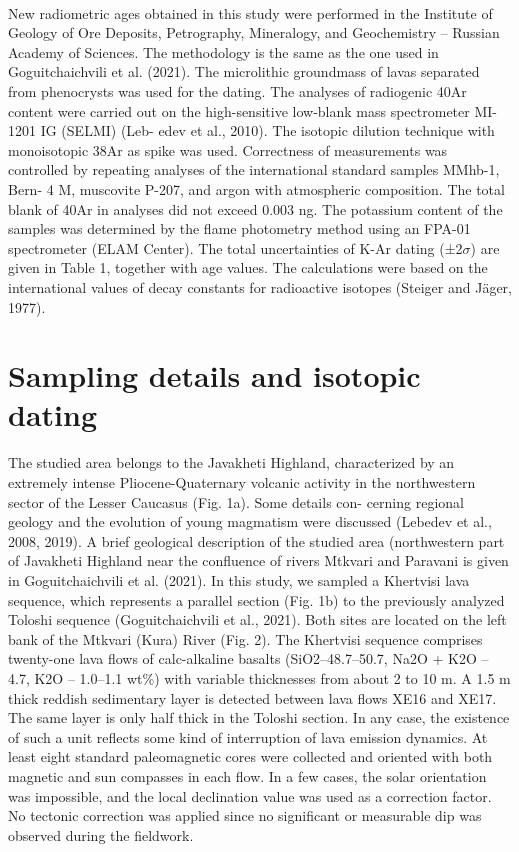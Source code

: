 \documentclass[review]{elsarticle}
\begin{document}
\\
New radiometric ages obtained in this study were performed in the
Institute of Geology of Ore Deposits, Petrography, Mineralogy, and
Geochemistry – Russian Academy of Sciences. The methodology is the
same as the one used in Goguitchaichvili et al. (2021). The microlithic
groundmass of lavas separated from phenocrysts was used for the
dating. The analyses of radiogenic 40Ar content were carried out on the
high-sensitive low-blank mass spectrometer MI-1201 IG (SELMI) (Leb-
edev et al., 2010). The isotopic dilution technique with monoisotopic
38Ar as spike was used. Correctness of measurements was controlled by
repeating analyses of the international standard samples MMhb-1, Bern-
4 M, muscovite P-207, and argon with atmospheric composition. The
total blank of 40Ar in analyses did not exceed 0.003 ng. The potassium
content of the samples was determined by the flame photometry method
using an FPA-01 spectrometer (ELAM Center). The total uncertainties of
K-Ar dating (±2$\sigma$) are given in Table 1, together with age values. The
calculations were based on the international values of decay constants
for radioactive isotopes (Steiger and J{\"a}ger, 1977).

\section{Sampling details and isotopic dating}
The studied area belongs to the Javakheti Highland, characterized by
an extremely intense Pliocene-Quaternary volcanic activity in the
northwestern sector of the Lesser Caucasus (Fig. 1a). Some details con-
cerning regional geology and the evolution of young magmatism were
discussed (Lebedev et al., 2008, 2019). A brief geological description of
the studied area (northwestern part of Javakheti Highland near the
confluence of rivers Mtkvari and Paravani is given in Goguitchaichvili
et al. (2021). In this study, we sampled a Khertvisi lava sequence, which
represents a parallel section (Fig. 1b) to the previously analyzed Toloshi
sequence (Goguitchaichvili et al., 2021). Both sites are located on the
left bank of the Mtkvari (Kura) River (Fig. 2). The Khertvisi sequence
comprises twenty-one lava flows of calc-alkaline basalts
(SiO2–48.7–50.7, Na2O + K2O – 4.7, K2O – 1.0–1.1 wt\%) with variable
thicknesses from about 2 to 10 m. A 1.5 m thick reddish sedimentary
layer is detected between lava flows XE16 and XE17. The same layer is
only half thick in the Toloshi section. In any case, the existence of such a
unit reflects some kind of interruption of lava emission dynamics. At least eight standard paleomagnetic cores were collected and oriented
with both magnetic and sun compasses in each flow. In a few cases, the
solar orientation was impossible, and the local declination value was
used as a correction factor. No tectonic correction was applied since no
significant or measurable dip was observed during the fieldwork.
\end{document}
